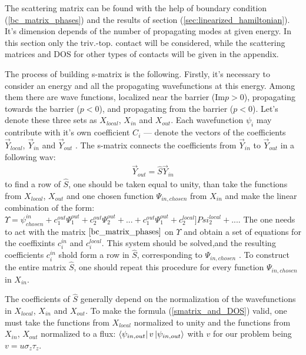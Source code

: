 The scattering matrix can be found with the help of boundary condition (\ref{bc_matrix_phases}) and the results of section (\ref{sec:linearized_hamiltonian}). It's dimension depends of the number of propagating modes at given energy. In this section only the triv.-top. contact will be considered, while the scattering matrices and DOS for other types of contacts will be given in the appendix.

The process of building s-matrix is the following. Firstly, it's necessary to consider an energy and all the propagating  wavefunctions at this energy. Among them there are wave functions, localized near the barrier ($ \mathrm{Im}p>0 $), propagating towards the barrier ($  p<0 $), and propagating from the barrier ($ p<0 $). Let's denote these  three sets as $ X_{local} $, $ X_{in}  $ and $ X_{out} $. Each wavefunction $ \psi_i $ may contribute with it's own coefficient $ C_i $ --- denote the vectors of the coefficients  $ \vec{Y}_{local} $, $ \vec{Y}_{in}  $ and $ \vec{Y}_{out} $ . The s-matrix connects the coefficients from $ \vec{Y}_{in}  $ to $ \vec{Y}_{out} $ in a following wav:
\begin{gather}
	\vec{Y}_{out} = \hat{S}\vec{Y}_{in}
\end{gather}
to find a row of $ \hat{S} $, one should be taken equal to unity, than take  the functions from $ X_{local} $, $ X_{out} $ and one chosen function $ \Psi_{in,chosen} $ from $ X_{in} $ and make the linear combination of the form: $\Upsilon =\psi^{in}_{chosen} + c^{out}_1\Psi^{out}_1+c^{out}_2\Psi^{out}_2+...+c^{out}_1\Psi^{out}_1+c^{local}_2]Psi^{local}_2+... $. The one needs to act with the matrix $ \ref{bc_matrix_phases} $ on $ \Upsilon $ and obtain a set of equations for the coeffixints $ {c^{in}_i} $ and $ {c^{local}_i} $. This system should be solved,and the resulting coefficients ${c^{in}_i}  $ shold form a row in $ \hat{S} $, corresponding to $ \Psi_{in,chosen} $ . To construct the entire matrix $ \hat{S} $, one should repeat this procedure for every function $ \Psi_{in,chosen} $ in $ X_{in} $.

The coefficients of $ \hat{S} $ generally depend on the normalization of the wavefunctions in $ X_{local} $, $ X_{in}  $ and $ X_{out} $. To make the formula (\ref{smatrix_and_DOS}) valid, one must take the functions from $ X_{local} $ normalized to unity and the functions from $ X_{in}  $, $ X_{out}$ normalized to a flux\cite{Akkermans_Avron_Shapiro_scattering_matrix}: $ \bra{\psi_{in,out}}v \ket{\psi_{in,out}} $ with $ v $ for our problem being $ v=u\sigma_z\tau_z $.

